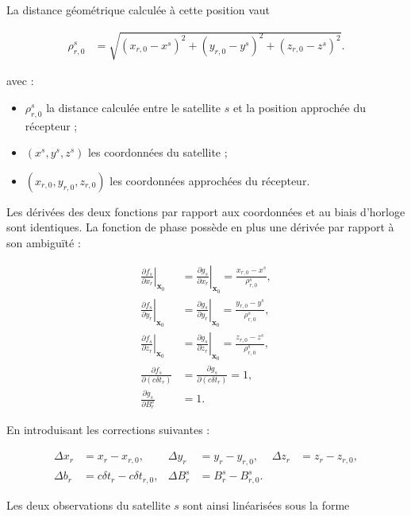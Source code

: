 La distance géométrique calculée à cette position vaut

\begin{align}
\rho_{r,0}^s
&=
\sqrt{(x_{r,0}-x^s)^2+(y_{r,0}-y^s)^2+(z_{r,0}-z^s)^2}.
\label{eq:geometric_range_at_initial_state}
\end{align}

avec :

\begin{itemize}
    \item $\rho_{r,0}^s$ la distance calculée entre le satellite $s$ et la
    position approchée du récepteur ;
    \item $(x^s,y^s,z^s)$ les coordonnées du satellite ;
    \item $(x_{r,0},y_{r,0},z_{r,0})$ les coordonnées approchées du
    récepteur.
\end{itemize}

Les dérivées des deux fonctions par rapport aux coordonnées et au biais
d'horloge sont identiques. La fonction de phase possède en plus une dérivée
par rapport à son ambiguïté :

\begin{align}
\left.\frac{\partial f_s}{\partial x_r}\right|_{\mathbf x_0}
&=
\left.\frac{\partial g_s}{\partial x_r}\right|_{\mathbf x_0}
=\frac{x_{r,0}-x^s}{\rho_{r,0}^s},
\\
\left.\frac{\partial f_s}{\partial y_r}\right|_{\mathbf x_0}
&=
\left.\frac{\partial g_s}{\partial y_r}\right|_{\mathbf x_0}
=\frac{y_{r,0}-y^s}{\rho_{r,0}^s},
\\
\left.\frac{\partial f_s}{\partial z_r}\right|_{\mathbf x_0}
&=
\left.\frac{\partial g_s}{\partial z_r}\right|_{\mathbf x_0}
=\frac{z_{r,0}-z^s}{\rho_{r,0}^s},
\\
\frac{\partial f_s}{\partial(c\delta t_r)}
&=
\frac{\partial g_s}{\partial(c\delta t_r)}=1,
\\
\frac{\partial g_s}{\partial B_r^s}
&=1.
\label{eq:component_observation_derivatives}
\end{align}


En introduisant les corrections suivantes :

\begin{align}
\Delta x_r&=x_r-x_{r,0},
&
\Delta y_r&=y_r-y_{r,0},
&
\Delta z_r&=z_r-z_{r,0},
\\
\Delta b_r&=c\delta t_r-c\delta t_{r,0},
&
\Delta B_r^s&=B_r^s-B_{r,0}^s.
\label{eq:state_component_corrections}
\end{align}

Les deux observations du satellite $s$ sont ainsi linéarisées sous la forme

